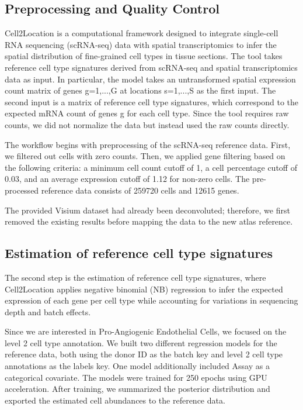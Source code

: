 \documentclass[a4paper,12pt]{article}
\begin{document}
\subsection{Preprocessing and Quality Control}
Cell2Location is a computational framework designed to integrate single-cell RNA sequencing (scRNA-seq) data with spatial transcriptomics to infer the spatial distribution of fine-grained cell types in tissue sections. The tool takes reference cell type signatures derived from scRNA-seq and spatial transcriptomics data as input. In particular, the model takes an untransformed spatial expression count matrix of genes g={1,...,G} at locations s={1,...,S} as the first input. The second input is a matrix of reference cell type signatures, which correspond to the expected mRNA count of genes g for each cell type. Since the tool requires raw counts, we did not normalize the data but instead used the raw counts directly. 

The workflow begins with preprocessing of the scRNA-seq reference data. First, we filtered out cells with zero counts. Then, we applied gene filtering based on the following criteria: a minimum cell count cutoff of 1, a cell percentage cutoff of 0.03, and an average expression cutoff of 1.12 for non-zero cells. The pre-processed reference data consists of 259720 cells and 12615 genes.

The provided Visium dataset had already been deconvoluted; therefore, we first removed the existing results before mapping the data to the new atlas reference.

\subsection{Estimation of reference cell type signatures}

The second step is the estimation of reference cell type signatures, where Cell2Location applies negative binomial (NB) regression to infer the expected expression of each gene per cell type while accounting for variations in sequencing depth and batch effects.

Since we are interested in Pro-Angiogenic Endothelial
Cells, we focused on the level 2 cell type annotation. We built two different regression models for the reference data, both using the donor ID as the batch key and level 2 cell type annotations as the labels key. One model additionally included Assay as a categorical covariate. The models were trained for 250 epochs using GPU acceleration. After training, we summarized the posterior distribution and exported the estimated cell abundances to the reference data.
\end{document}
